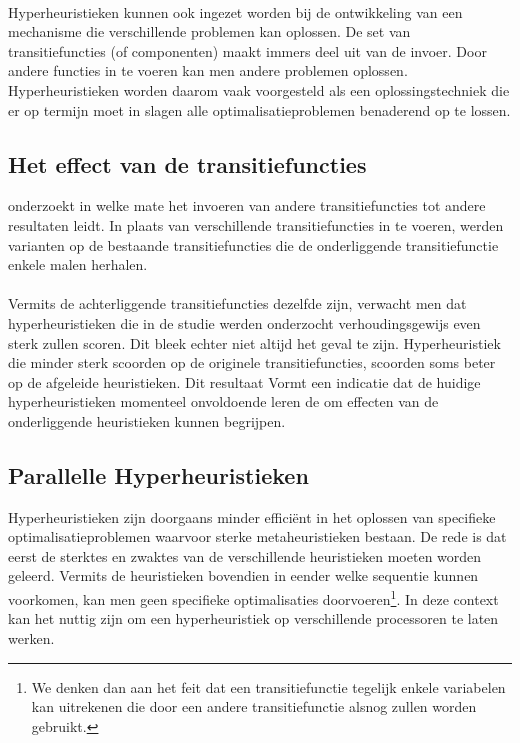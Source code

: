 \paragraph{}
Hyperheuristieken kunnen ook ingezet worden bij de ontwikkeling van een mechanisme die verschillende problemen kan oplossen. De set van transitiefuncties (of componenten) maakt immers deel uit van de invoer. Door andere functies in te voeren kan men andere problemen oplossen. Hyperheuristieken worden daarom vaak voorgesteld als een oplossingstechniek die er op termijn moet in slagen alle optimalisatieproblemen benaderend op te lossen.

\subsection{Het effect van de transitiefuncties}
\cite{DBLP:conf/ppsn/MisirVCB12} onderzoekt in welke mate het invoeren van andere transitiefuncties tot andere resultaten leidt. In plaats van verschillende transitiefuncties in te voeren, werden varianten op de bestaande transitiefuncties die de onderliggende transitiefunctie enkele malen herhalen.

\paragraph{}
Vermits de achterliggende transitiefuncties dezelfde zijn, verwacht men dat hyperheuristieken die in de studie werden onderzocht verhoudingsgewijs even sterk zullen scoren. Dit bleek echter niet altijd het geval te zijn. Hyperheuristiek die minder sterk scoorden op de originele transitiefuncties, scoorden soms beter op de afgeleide heuristieken. Dit resultaat Vormt een indicatie dat de huidige hyperheuristieken momenteel onvoldoende leren de om effecten van de onderliggende heuristieken kunnen begrijpen.

\subsection{Parallelle Hyperheuristieken}

Hyperheuristieken zijn doorgaans minder effici\"ent in het oplossen van specifieke optimalisatieproblemen waarvoor sterke metaheuristieken bestaan. De rede is dat eerst de sterktes en zwaktes van de verschillende heuristieken moeten worden geleerd. Vermits de heuristieken bovendien in eender welke sequentie kunnen voorkomen, kan men geen specifieke optimalisaties doorvoeren\footnote{We denken dan aan het feit dat een transitiefunctie tegelijk enkele variabelen kan uitrekenen die door een andere transitiefunctie alsnog zullen worden gebruikt.}. In deze context kan het nuttig zijn om een hyperheuristiek op verschillende processoren te laten werken.

